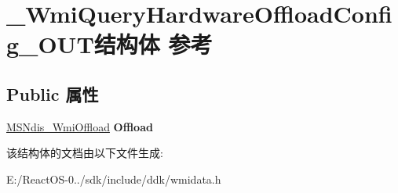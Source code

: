 \hypertarget{struct___wmi_query_hardware_offload_config___o_u_t}{}\section{\+\_\+\+Wmi\+Query\+Hardware\+Offload\+Config\+\_\+\+O\+U\+T结构体 参考}
\label{struct___wmi_query_hardware_offload_config___o_u_t}
\subsection*{Public 属性}
\begin{DoxyCompactItemize}
\item 
\mbox{\label{struct___wmi_query_hardware_offload_config___o_u_t_a05377df28fa715b80aa6b095135bc6d5}} 
\hyperlink{struct___m_s_ndis___wmi_offload}{M\+S\+Ndis\+\_\+\+Wmi\+Offload} {\bfseries Offload}
\end{DoxyCompactItemize}


该结构体的文档由以下文件生成\+:\begin{DoxyCompactItemize}
\item 
E\+:/\+React\+O\+S-\/0../sdk/include/ddk/wmidata.\+h\end{DoxyCompactItemize}
